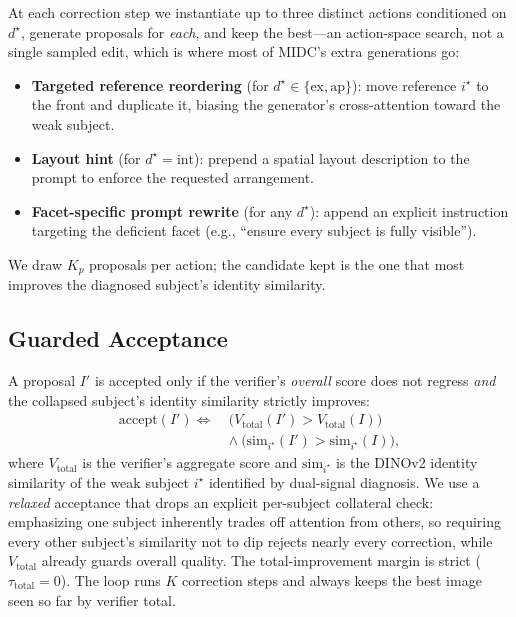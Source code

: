 \documentclass[letterpaper]{article}
\begin{document}
At each correction step we instantiate up to three distinct actions conditioned on $d^\star$, generate proposals for \emph{each}, and keep the best---an action-space search, not a single sampled edit, which is where most of MIDC's extra generations go:
\begin{itemize}
\item \textbf{Targeted reference reordering} (for $d^\star\in\{\mathrm{ex},\mathrm{ap}\}$): move reference $i^\star$ to the front and duplicate it, biasing the generator's cross-attention toward the weak subject.
\item \textbf{Layout hint} (for $d^\star=\mathrm{int}$): prepend a spatial layout description to the prompt to enforce the requested arrangement.
\item \textbf{Facet-specific prompt rewrite} (for any $d^\star$): append an explicit instruction targeting the deficient facet (e.g., ``ensure every subject is fully visible'').
\end{itemize}
We draw $K_p$ proposals per action; the candidate kept is the one that most improves the diagnosed subject's identity similarity.

\subsection{Guarded Acceptance}
\label{sec:accept}

A proposal $I'$ is accepted only if the verifier's \emph{overall} score does not regress \emph{and} the collapsed subject's identity similarity strictly improves:
\[
\begin{aligned}
\mathrm{accept}(I') \iff\ & \big(V_{\mathrm{total}}(I') > V_{\mathrm{total}}(I)\big) \\[-1pt]
 &\wedge\ \big(\mathrm{sim}_{i^\star}(I') > \mathrm{sim}_{i^\star}(I)\big),
\end{aligned}
\]
where $V_{\mathrm{total}}$ is the verifier's aggregate score and $\mathrm{sim}_{i^\star}$ is the DINOv2 identity similarity of the weak subject $i^\star$ identified by dual-signal diagnosis. We use a \emph{relaxed} acceptance that drops an explicit per-subject collateral check: emphasizing one subject inherently trades off attention from others, so requiring every other subject's similarity not to dip rejects nearly every correction, while $V_{\mathrm{total}}$ already guards overall quality. The total-improvement margin is strict ($\tau_{\mathrm{total}}{=}0$). The loop runs $K$ correction steps and always keeps the best image seen so far by verifier total.
\end{document}
